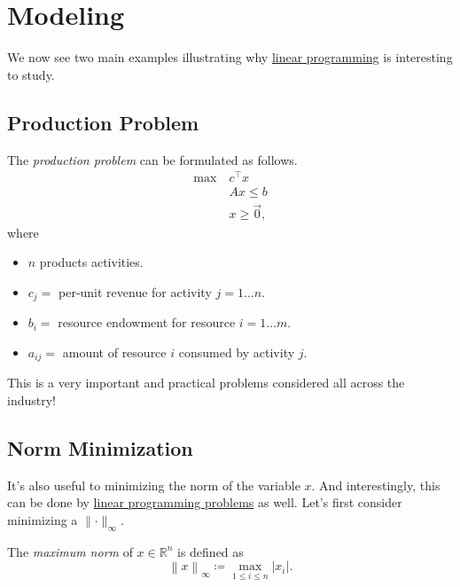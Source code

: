 \section{Modeling}
We now see two main examples illustrating why \hyperref[def:general-linear-programming-problem]{linear programming} is interesting to study.

\subsection{Production Problem}\label{subsec:production-problem}
The \emph{production problem} can be formulated as follows.
\[
	\begin{aligned}
		\max~ & c^{\top}x      \\
		      & Ax \leq b      \\
		      & x\geq \vec{0},
	\end{aligned}
\]
where
\begin{itemize}
	\item \(n\) products activities.
	\item \(c_{j}=\) per-unit revenue for activity \(j = 1\ldots n\).
	\item \(b_{i}=\) resource endowment for resource \(i = 1\ldots m\).
	\item \(a_{ij}=\) amount of resource \(i\) consumed by activity \(j\).
\end{itemize}

\begin{note}
	This is a very important and practical problems considered all across the industry!
\end{note}

\subsection{Norm Minimization}
It's also useful to minimizing the norm of the variable \(x\). And interestingly, this can be done by \hyperref[def:general-linear-programming-problem]{linear programming problems} as well. Let's first consider minimizing a \(\lVert \cdot \rVert _\infty \).

\begin{definition}\label{def:maximum-norm}
	The \emph{maximum norm} of \(x\in \mathbb{R} ^n\) is defined as
	\[
		\left\lVert x\right\rVert _{\infty } \coloneqq \max_{1\leq i \leq n} \vert x_i \vert .
	\]
\end{definition}


